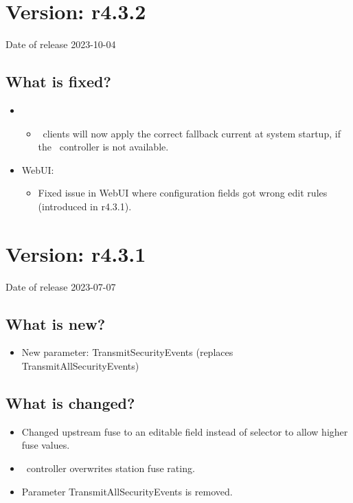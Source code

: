 \documentclass{scrartcl}
\begin{document}
\section{Version: r4.3.2}
Date of release 2023-10-04

\subsection*{What is fixed?}

\begin{itemize}
  \item \nanogrid\
  \begin{itemize}
    \item \nanogrid\ clients will now apply the correct fallback current at system startup, if the \nanogrid\ controller is not available.
  \end{itemize}
  \item WebUI:
  \begin{itemize}
   \item Fixed issue in WebUI where configuration fields got wrong edit rules (introduced in r4.3.1).
  \end{itemize}
\end{itemize}



\section{Version: r4.3.1}
Date of release 2023-07-07

\subsection*{What is new?}

\begin{itemize}
\item New parameter: TransmitSecurityEvents (replaces TransmitAllSecurityEvents)
\end{itemize}

\subsection*{What is changed?}

\begin{itemize}
\item Changed upstream fuse to an editable field instead of selector to allow higher fuse values.
\item \nanogrid\ controller overwrites station fuse rating.
\item Parameter TransmitAllSecurityEvents is removed.
\end{itemize}
\end{document}
